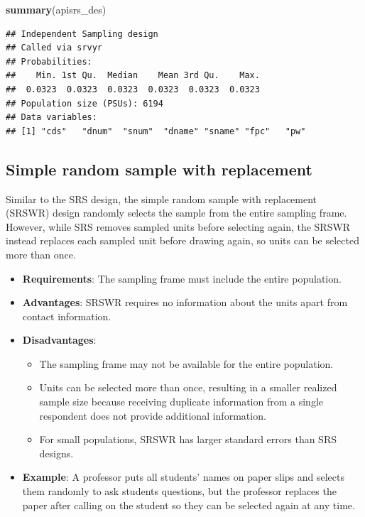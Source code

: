 \documentclass[
]{krantz}
\makeatletter
\newenvironment{Shaded}{\begin{snugshade}}{\end{snugshade}}
\newcommand{\FunctionTok}[1]{\textcolor[rgb]{0.27,0.27,0.27}{\textbf{#1}}}
\newcommand{\NormalTok}[1]{#1}
\providecommand{\tightlist}{%
  \setlength{\itemsep}{0pt}\setlength{\parskip}{0pt}}
\newenvironment{kframe}{%
\medskip{}
\setlength{\fboxsep}{.8em}
 \def\at@end@of@kframe{}%
 \ifinner\ifhmode%
  \def\at@end@of@kframe{\end{minipage}}%
  \begin{minipage}{\columnwidth}%
 \fi\fi%
 \def\FrameCommand##1{\hskip\@totalleftmargin \hskip-\fboxsep
 \colorbox{shadecolor}{##1}\hskip-\fboxsep
     \hskip-\linewidth \hskip-\@totalleftmargin \hskip\columnwidth}%
 \MakeFramed {\advance\hsize-\width
   \@totalleftmargin\z@ \linewidth\hsize
   \@setminipage}}%
 {\par\unskip\endMakeFramed%
 \at@end@of@kframe}
\renewenvironment{Shaded}{\begin{kframe}}{\end{kframe}}
\makeatother
\begin{document}
\begin{Shaded}
\begin{Highlighting}[]
\FunctionTok{summary}\NormalTok{(apisrs\_des)}
\end{Highlighting}
\end{Shaded}

\begin{verbatim}
## Independent Sampling design
## Called via srvyr
## Probabilities:
##    Min. 1st Qu.  Median    Mean 3rd Qu.    Max. 
##  0.0323  0.0323  0.0323  0.0323  0.0323  0.0323 
## Population size (PSUs): 6194 
## Data variables:
## [1] "cds"   "dnum"  "snum"  "dname" "sname" "fpc"   "pw"
\end{verbatim}

\hypertarget{simple-random-sample-with-replacement}{%
\subsection{Simple random sample with replacement}\label{simple-random-sample-with-replacement}}

Similar to the SRS design, the simple random sample with replacement (SRSWR) design randomly selects the sample from the entire sampling frame. However, while SRS removes sampled units before selecting again, the SRSWR instead replaces each sampled unit before drawing again, so units can be selected more than once.

\begin{itemize}
\tightlist
\item
  \textbf{Requirements}: The sampling frame must include the entire population.
\item
  \textbf{Advantages}: SRSWR requires no information about the units apart from contact information.
\item
  \textbf{Disadvantages}:

  \begin{itemize}
  \tightlist
  \item
    The sampling frame may not be available for the entire population.
  \item
    Units can be selected more than once, resulting in a smaller realized sample size because receiving duplicate information from a single respondent does not provide additional information.
  \item
    For small populations, SRSWR has larger standard errors than SRS designs.
  \end{itemize}
\item
  \textbf{Example}: A professor puts all students' names on paper slips and selects them randomly to ask students questions, but the professor replaces the paper after calling on the student so they can be selected again at any time.
\end{itemize}
\end{document}
